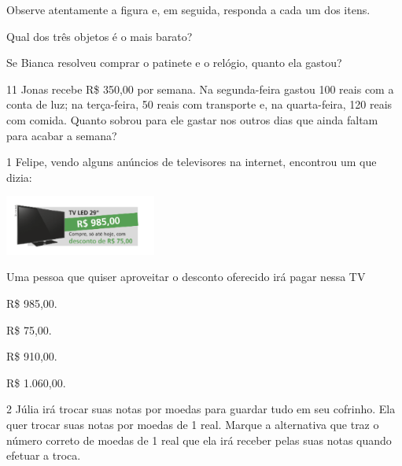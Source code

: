 Observe atentamente a figura e, em seguida, responda a cada um dos itens.

\begin{escolha}
\item Qual dos três objetos é o mais barato?


\item Se Bianca resolveu comprar o patinete e o relógio, quanto ela gastou?

\end{escolha}

\num{11} Jonas recebe R\$ 350,00 por semana. Na segunda-feira gastou 100 reais
com a conta de luz; na terça-feira, 50 reais com transporte e, na quarta-feira, 120 reais com comida. Quanto sobrou para ele gastar nos outros
dias que ainda faltam para acabar a semana?



\num{1} Felipe, vendo alguns anúncios de televisores na internet, encontrou um que dizia:


\includegraphics[width=1.95850in,height=0.77507in]{./media/image81.png}

Uma pessoa que quiser aproveitar o desconto oferecido irá pagar nessa TV

\begin{escolha}
\item
  R\$ 985,00.
\item
  R\$ 75,00.
\item
  R\$ 910,00.
\item
  R\$ 1.060,00.
\end{escolha}

\num{2} Júlia irá trocar suas notas por moedas para guardar tudo em seu
cofrinho. Ela quer trocar suas notas por moedas de 1 real. Marque a
alternativa que traz o número correto de moedas de 1 real que ela
irá receber pelas suas notas quando efetuar a troca.

